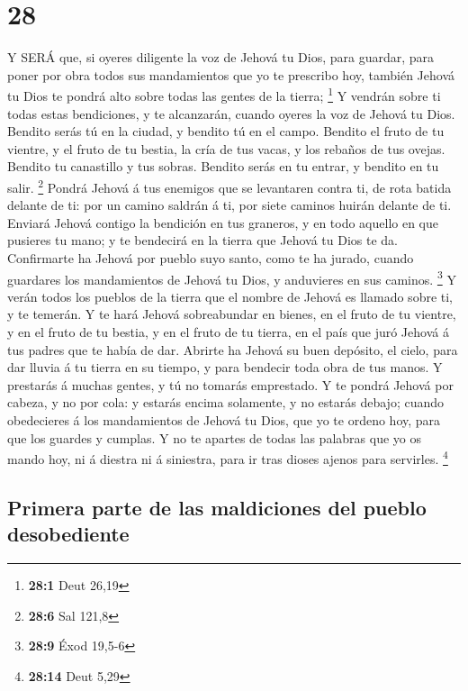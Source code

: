 \hypertarget{section-27}{%
\section{28}\label{section-27}}

 Y SERÁ que, si oyeres diligente la voz de Jehová tu Dios,
para guardar, para poner por obra todos sus mandamientos que yo te
prescribo hoy, también Jehová tu Dios te pondrá alto sobre todas las
gentes de la tierra; \footnote{\textbf{28:1} Deut 26,19}  Y
vendrán sobre ti todas estas bendiciones, y te alcanzarán, cuando oyeres
la voz de Jehová tu Dios.  Bendito serás tú en la ciudad, y
bendito tú en el campo.  Bendito el fruto de tu vientre, y
el fruto de tu bestia, la cría de tus vacas, y los rebaños de tus
ovejas.  Bendito tu canastillo y tus sobras. 
Bendito serás en tu entrar, y bendito en tu salir. \footnote{\textbf{28:6}
  Sal 121,8}  Pondrá Jehová á tus enemigos que se levantaren
contra ti, de rota batida delante de ti: por un camino saldrán á ti, por
siete caminos huirán delante de ti.  Enviará Jehová contigo
la bendición en tus graneros, y en todo aquello en que pusieres tu mano;
y te bendecirá en la tierra que Jehová tu Dios te da. 
Confirmarte ha Jehová por pueblo suyo santo, como te ha jurado, cuando
guardares los mandamientos de Jehová tu Dios, y anduvieres en sus
caminos. \footnote{\textbf{28:9} Éxod 19,5-6}  Y verán
todos los pueblos de la tierra que el nombre de Jehová es llamado sobre
ti, y te temerán.  Y te hará Jehová sobreabundar en bienes,
en el fruto de tu vientre, y en el fruto de tu bestia, y en el fruto de
tu tierra, en el país que juró Jehová á tus padres que te había de dar.
 Abrirte ha Jehová su buen depósito, el cielo, para dar
lluvia á tu tierra en su tiempo, y para bendecir toda obra de tus manos.
Y prestarás á muchas gentes, y tú no tomarás emprestado.  Y
te pondrá Jehová por cabeza, y no por cola: y estarás encima solamente,
y no estarás debajo; cuando obedecieres á los mandamientos de Jehová tu
Dios, que yo te ordeno hoy, para que los guardes y cumplas.
 Y no te apartes de todas las palabras que yo os mando hoy,
ni á diestra ni á siniestra, para ir tras dioses ajenos para servirles.
\footnote{\textbf{28:14} Deut 5,29}

\hypertarget{primera-parte-de-las-maldiciones-del-pueblo-desobediente}{%
\subsection{Primera parte de las maldiciones del pueblo
desobediente}\label{primera-parte-de-las-maldiciones-del-pueblo-desobediente}}

